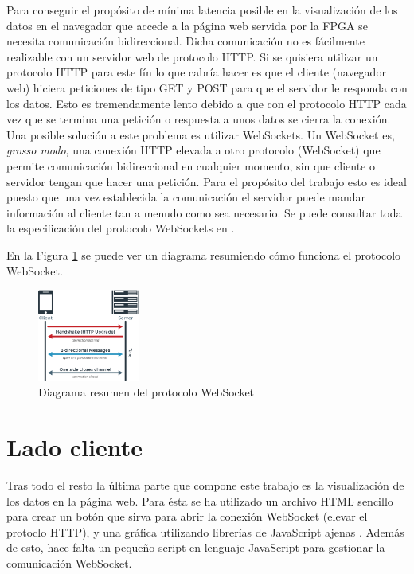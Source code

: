 \documentclass[conference,compsoc]{IEEEtran}
\begin{document}
		Para conseguir el prop\'osito de m\'inima latencia posible en la visualizaci\'on de los datos en
		el navegador que accede a la p\'agina web servida por la FPGA se necesita comunicaci\'on
		bidireccional. Dicha comunicaci\'on no es f\'acilmente realizable con un servidor web de
		protocolo HTTP. Si se quisiera utilizar un protocolo HTTP para este f\'in lo que cabr\'ia hacer
		es que el cliente (navegador web) hiciera peticiones de tipo GET y POST para que el servidor le
		responda con los datos. Esto es tremendamente lento debido a que con el protocolo HTTP cada vez
		que se termina una petici\'on o respuesta a unos datos se cierra la conexi\'on. Una posible
		soluci\'on a este problema es utilizar WebSockets. Un WebSocket es, \emph{grosso modo}, una
		conexi\'on HTTP elevada a otro protocolo (WebSocket) que permite comunicaci\'on bidireccional en
		cualquier momento, sin que cliente o servidor tengan que hacer una petici\'on. Para el
		prop\'osito del trabajo esto es ideal puesto que una vez establecida la comunicaci\'on el
		servidor puede mandar informaci\'on al cliente tan a menudo como sea necesario. Se puede
		consultar toda la especificaci\'on del protocolo WebSockets en \cite{bib:ws}.

		En la Figura \ref{fig:ws_diagrama} se puede ver un diagrama resumiendo c\'omo funciona el
		protocolo WebSocket.

		\begin{figure}[h!]
			\centering
			\includegraphics[width=0.3\textwidth]{./figuras/ws_diagrama.png}
			\caption{Diagrama resumen del protocolo WebSocket}
			\label{fig:ws_diagrama}
		\end{figure}

	\section{Lado cliente}

		Tras todo el resto la \'ultima parte que compone este trabajo es la visualizaci\'on de los datos
		en la p\'agina web. Para \'esta se ha utilizado un archivo HTML sencillo para crear un bot\'on
		que sirva para abrir la conexi\'on WebSocket (elevar el protoclo HTTP), y una gr\'afica
		utilizando librer\'ias de JavaScript ajenas \cite{bib:plotly-js}. Adem\'as de esto, hace falta
		un peque\~no script en lenguaje JavaScript para gestionar la comunicaci\'on WebSocket.
\end{document}
